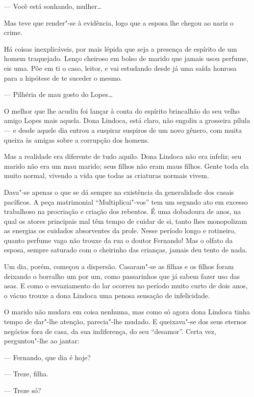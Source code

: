--- Você está sonhando, mulher\ldots{}

Mas teve que render"-se à evidência, logo que a esposa lhe chegou ao
nariz o crime.

Há coisas inexplicáveis, por mais lépida que seja a presença de espírito
de um homem traquejado. Lenço cheiroso em bolso de marido que jamais
usou perfume, eis uma. Põe em ti o caso, leitor, e vai estudando desde
já uma saída honrosa para a hipótese de te suceder o mesmo.

--- Pilhéria de mau gosto do Lopes\ldots{}

O melhor que lhe acudiu foi lançar à conta do espírito brincalhão do seu
velho amigo Lopes mais aquela. Dona Lindoca, está claro, não engoliu a
grosseira pílula --- e desde aquele dia entrou a suspirar suspiros de um
novo gênero, com muita queixa às amigas sobre a corrupção dos homens.

Mas a realidade era diferente de tudo aquilo. Dona Lindoca não era
infeliz; seu marido não era um mau marido; seus filhos não eram maus
filhos. Gente toda ela muito normal, vivendo a vida que todas as
criaturas normais vivem.

Dava"-se apenas o que se dá sempre na existência da generalidade dos
casais pacíficos. A peça matrimonial ``Multiplicai"-vos'' tem um segundo
ato em excesso trabalhoso na procriação e criação dos rebentos. É uma
dobadoura de anos, na qual os atores principais mal têm tempo de cuidar
de si, tanto lhes monopolizam as energias os cuidados absorventes da
prole. Nesse período longo e rotineiro, quanto perfume vago não trouxe
da rua o doutor Fernando! Mas o olfato da esposa, sempre saturado com o
cheirinho das crianças, jamais deu tento de nada.

Um dia, porém, começou a dispersão. Casaram"-se as filhas e os filhos
foram deixando o borralho um por um, como passarinhos que já sabem fazer
uso das asas. E como o esvaziamento do lar ocorreu no período muito
curto de dois anos, o vácuo trouxe a dona Lindoca uma penosa sensação de
infelicidade.

O marido não mudara em coisa nenhuma, mas como só agora dona Lindoca
tinha tempo de dar"-lhe atenção, parecia"-lhe mudado. E queixava"-se dos
seus eternos negócios fora de casa, da sua indiferença, do seu
``desamor''. Certa vez, perguntou"-lhe ao jantar:

--- Fernando, que dia é hoje?

--- Treze, filha.

--- Treze só?

